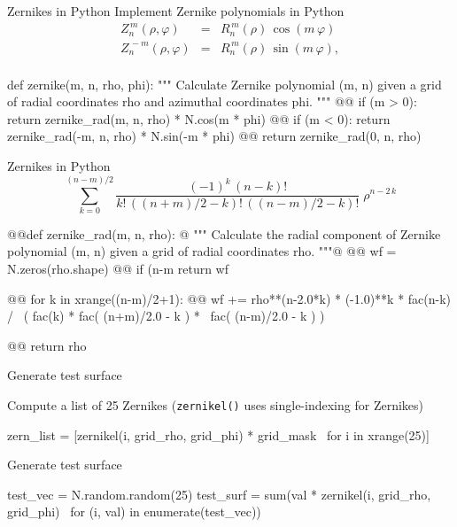 \documentclass[xetex,10pt]{beamer}
\def\pythoni{\lstinline[language=pythontim]}
\def\spacer{\vspace*{1em}}
\begin{document}
\begin{frame}[fragile]{Zernikes in Python}
Implement Zernike polynomials in Python
\spacer
	\[
	\begin{array}{lcl}
	Z^{\,m}_n(\rho,\varphi) &=& R^{\,m}_{n}(\rho)\,\cos(m\,\varphi) \! \\
	Z^{\,-\!m}_n(\rho,\varphi) &=& R^{\,m}_{n}(\rho)\,\sin(m\,\varphi), \! \\
  	\end{array}
	\]
\spacer
\begin{pythonln}[firstnumber=49]
def zernike(m, n, rho, phi):
  """
  Calculate Zernike polynomial (m, n) given a grid of radial
  coordinates rho and azimuthal coordinates phi.
  """
@@  if (m > 0): return zernike_rad(m, n, rho) * N.cos(m * phi)
@@  if (m < 0): return zernike_rad(-m, n, rho) * N.sin(-m * phi)
@@  return zernike_rad(0, n, rho)
\end{pythonln}
\end{frame}

\begin{frame}[fragile]{Zernikes in Python}
	\[
	\sum_{k=0}^{(n-m)/2} \!\!\! \frac{(-1)^k\,(n-k)!}{k!\,((n+m)/2-k)!\,((n-m)/2-k)!} \;\rho^{n-2\,k}
	\]
\begin{pythonln}[firstnumber=26]
@@def zernike_rad(m, n, rho):
@  """
  Calculate the radial component of Zernike polynomial (m, n)
  given a grid of radial coordinates rho.
  """@
@@  wf = N.zeros(rho.shape)
@@  if (n-m %
    return wf
  
@@  for k in xrange((n-m)/2+1):
@@    wf += rho**(n-2.0*k) * (-1.0)**k * fac(n-k) / \
    	( fac(k) * fac( (n+m)/2.0 - k ) * \
      fac( (n-m)/2.0 - k ) )
  
@@  return rho
\end{pythonln}
\end{frame}

\begin{frame}[fragile]{Generate test surface}

Compute a list of 25 Zernikes (\pythoni{zernikel()} uses single-indexing for Zernikes)
\spacer
\begin{pythonln}[firstnumber=94]
zern_list = [zernikel(i, grid_rho, grid_phi) * grid_mask \
  for i in xrange(25)]
\end{pythonln}

\spacer
\pause
Generate test surface

\begin{pythonln}[firstnumber=98]
test_vec = N.random.random(25)
test_surf = sum(val * zernikel(i, grid_rho, grid_phi) \
  for (i, val) in enumerate(test_vec))
\end{pythonln}
\end{frame}
\end{document}
